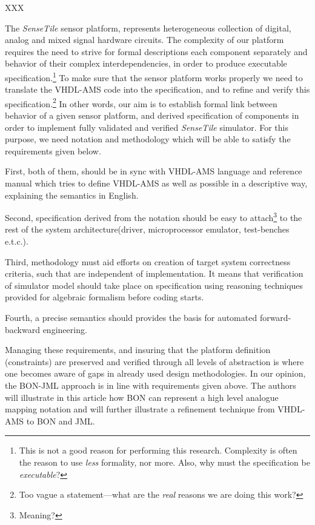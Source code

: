 \documentclass{article}
\newcommand{\ST}{\emph{SenseTile}\xspace}
\begin{document}
XXX

The \ST sensor platform, represents heterogeneous collection of
digital, analog and mixed signal hardware circuits.  The complexity of
our platform requires the need to strive for formal descriptions each
component separately and behavior of their complex interdependencies,
in order to produce executable specification.\footnote{This is not a
  good reason for performing this research.  Complexity is often the
  reason to use \emph{less} formality, nor more.  Also, why must the
  specification be \emph{executable}?}  To make sure that the sensor
platform works properly we need to translate the VHDL-AMS code into
the specification, and to refine and verify this
specification.\footnote{Too vague a statement---what are the
  \emph{real} reasons we are doing this work?}  In other words, our
aim is to establish formal link between behavior of a given sensor
platform, and derived specification of components in order to
implement fully validated and verified \ST simulator.  For this
purpose, we need notation and methodology which will be able to
satisfy the requirements given below.

First, both of them, should be in sync with VHDL-AMS language and
reference manual which tries to define VHDL-AMS as well as possible in
a descriptive way, explaining the semantics in English.

Second, specification derived from the notation should be easy to
attach\footnote{Meaning?} to the rest of the system
architecture\xspace(driver, microprocessor emulator, test-benches
e.t.c.).

Third, methodology must aid efforts on creation of target system
correctness criteria, such that are independent of implementation.  It
means that verification of simulator model should take place on
specification using reasoning techniques provided for algebraic
formalism before coding starts.

Fourth, a precise semantics should provides the basis for automated
forward-backward engineering.

Managing these requirements, and insuring that the platform definition
(constraints) are preserved and verified through all levels of
abstraction is where one becomes aware of gaps in already used design
methodologies.  In our opinion, the BON-JML approach is in line with
requirements given above.  The authors will illustrate in this article
how BON can represent a high level analogue mapping notation and will
further illustrate a refinement technique from VHDL-AMS to BON and
JML.
\end{document}
